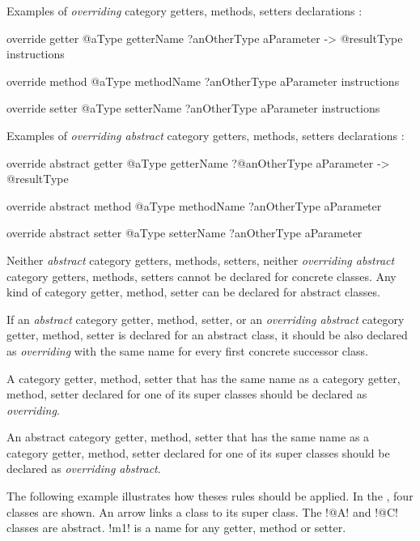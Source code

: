 Examples of \emph{overriding} category getters, methods, setters declarations :
\begin{galgas}
override getter @aType getterName
  ?anOtherType aParameter
  -> @resultType
{
  instructions
}

override method @aType methodName
  ?anOtherType aParameter
{
  instructions
}

override setter @aType setterName
  ?anOtherType aParameter
{
  instructions
}
\end{galgas}


Examples of \emph{overriding abstract} category getters, methods, setters declarations :
\begin{galgas}
override abstract getter @aType getterName
  ?@anOtherType aParameter
  -> @resultType

override abstract method @aType methodName
  ?anOtherType aParameter

override abstract setter @aType setterName
  ?anOtherType aParameter

\end{galgas}



Neither \emph{abstract} category getters, methods, setters, neither \emph{overriding abstract} category getters, methods, setters cannot be declared for concrete classes. Any kind of category getter, method, setter can be declared for abstract classes.

If an \emph{abstract} category getter, method, setter, or an \emph{overriding abstract} category getter, method, setter is declared for an abstract class, it should be also declared as \emph{overriding} with the same name for every first concrete successor class.

A category getter, method, setter that has the same name as a category getter, method, setter declared for one of its super classes should be declared as \emph{overriding}.

An abstract category getter, method, setter that has the same name as a category getter, method, setter declared for one of its super classes should be declared as \emph{overriding abstract}.

The following example illustrates how theses rules should be applied. In the , four classes are shown. An arrow links a class to its super class. The \ggs!@A! and \ggs!@C! classes are abstract. \ggs!m1! is a name for any getter, method or setter.

